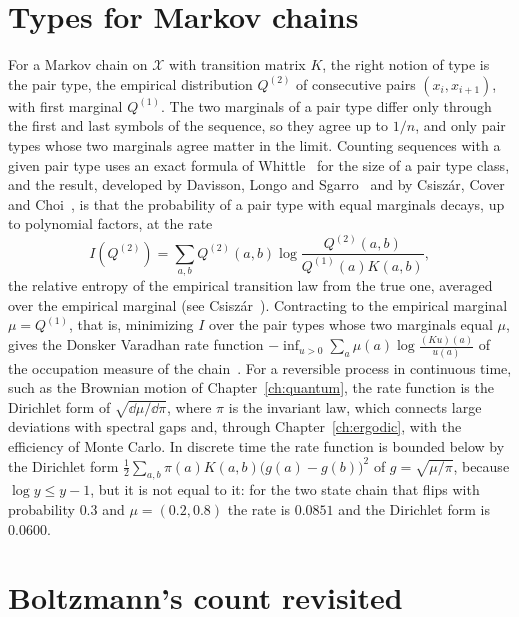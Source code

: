 \section{Types for Markov chains}

For a Markov chain on $\mathcal{X}$ with transition matrix $K$, the right notion of type is the pair type, the empirical distribution $Q^{(2)}$ of consecutive pairs $(x_i,x_{i+1})$, with first marginal $Q^{(1)}$. The two marginals of a pair type differ only through the first and last symbols of the sequence, so they agree up to $1/n$, and only pair types whose two marginals agree matter in the limit. Counting sequences with a given pair type uses an exact formula of Whittle~\cite{whittle1955} for the size of a pair type class, and the result, developed by Davisson, Longo and Sgarro~\cite{davisson1981} and by Csisz\'ar, Cover and Choi~\cite{csiszar1987}, is that the probability of a pair type with equal marginals decays, up to polynomial factors, at the rate
\[
I(Q^{(2)}) = \sum_{a,b}Q^{(2)}(a,b)\log\frac{Q^{(2)}(a,b)}{Q^{(1)}(a)K(a,b)},
\]
the relative entropy of the empirical transition law from the true one, averaged over the empirical marginal (see Csisz\'ar~\cite[Section~VII]{csiszar1998}). Contracting to the empirical marginal $\mu = Q^{(1)}$, that is, minimizing $I$ over the pair types whose two marginals equal $\mu$, gives the Donsker Varadhan rate function $-\inf_{u>0}\sum_a\mu(a)\log\frac{(Ku)(a)}{u(a)}$ of the occupation measure of the chain~\cite{donsker1975,dembozeitouni}. For a reversible process in continuous time, such as the Brownian motion of Chapter~\ref{ch:quantum}, the rate function is the Dirichlet form of $\sqrt{\dd\mu/\dd\pi}$, where $\pi$ is the invariant law, which connects large deviations with spectral gaps and, through Chapter~\ref{ch:ergodic}, with the efficiency of Monte Carlo. In discrete time the rate function is bounded below by the Dirichlet form $\frac12\sum_{a,b}\pi(a)K(a,b)\big(g(a)-g(b)\big)^2$ of $g = \sqrt{\mu/\pi}$, because $\log y\leq y-1$, but it is not equal to it: for the two state chain that flips with probability $0.3$ and $\mu = (0.2,0.8)$ the rate is $0.0851$ and the Dirichlet form is $0.0600$.

\section{Boltzmann's count revisited}

